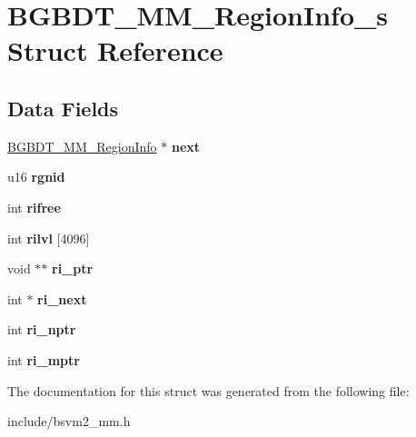 \hypertarget{structBGBDT__MM__RegionInfo__s}{\section{B\-G\-B\-D\-T\-\_\-\-M\-M\-\_\-\-Region\-Info\-\_\-s Struct Reference}
\label{structBGBDT__MM__RegionInfo__s}
}
\subsection*{Data Fields}
\begin{DoxyCompactItemize}
\item 
\hypertarget{structBGBDT__MM__RegionInfo__s_a251d9db2881bd2b1f12441684fa2597d}{\hyperlink{structBGBDT__MM__RegionInfo__s}{B\-G\-B\-D\-T\-\_\-\-M\-M\-\_\-\-Region\-Info} $\ast$ {\bfseries next}}\label{structBGBDT__MM__RegionInfo__s_a251d9db2881bd2b1f12441684fa2597d}

\item 
\hypertarget{structBGBDT__MM__RegionInfo__s_a8c3c2e10a64888d5185b1ee47ae76c95}{u16 {\bfseries rgnid}}\label{structBGBDT__MM__RegionInfo__s_a8c3c2e10a64888d5185b1ee47ae76c95}

\item 
\hypertarget{structBGBDT__MM__RegionInfo__s_abacee2efced5042869a5d511c07485c5}{int {\bfseries rifree}}\label{structBGBDT__MM__RegionInfo__s_abacee2efced5042869a5d511c07485c5}

\item 
\hypertarget{structBGBDT__MM__RegionInfo__s_ab382cecafecc22859ba66a22aedaab73}{int {\bfseries rilvl} \mbox{[}4096\mbox{]}}\label{structBGBDT__MM__RegionInfo__s_ab382cecafecc22859ba66a22aedaab73}

\item 
\hypertarget{structBGBDT__MM__RegionInfo__s_a63681c1a70991fe421bd6a4ecec0395d}{void $\ast$$\ast$ {\bfseries ri\-\_\-ptr}}\label{structBGBDT__MM__RegionInfo__s_a63681c1a70991fe421bd6a4ecec0395d}

\item 
\hypertarget{structBGBDT__MM__RegionInfo__s_a1ffaeb276f2ba2f5f56da75886799dc2}{int $\ast$ {\bfseries ri\-\_\-next}}\label{structBGBDT__MM__RegionInfo__s_a1ffaeb276f2ba2f5f56da75886799dc2}

\item 
\hypertarget{structBGBDT__MM__RegionInfo__s_ae1ca447f6277e6ff2f7b8cb40d7b3876}{int {\bfseries ri\-\_\-nptr}}\label{structBGBDT__MM__RegionInfo__s_ae1ca447f6277e6ff2f7b8cb40d7b3876}

\item 
\hypertarget{structBGBDT__MM__RegionInfo__s_a48cb0473b4475539bba9fa4e261c3abe}{int {\bfseries ri\-\_\-mptr}}\label{structBGBDT__MM__RegionInfo__s_a48cb0473b4475539bba9fa4e261c3abe}

\end{DoxyCompactItemize}


The documentation for this struct was generated from the following file\-:\begin{DoxyCompactItemize}
\item 
include/bsvm2\-\_\-mm.\-h\end{DoxyCompactItemize}
